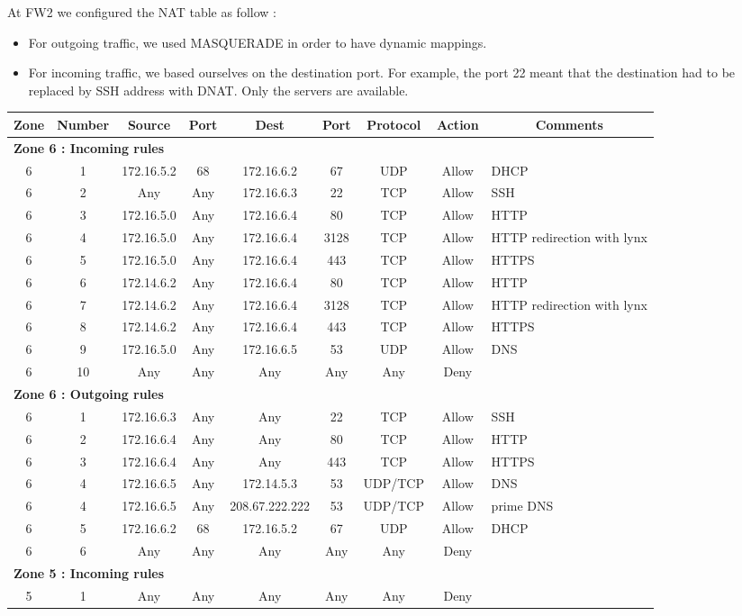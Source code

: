 \documentclass[a4paper,titlepage]{article}
\begin{document}
At FW2 we configured the NAT table as follow :
\begin{itemize}
\item For outgoing traffic, we used MASQUERADE in order to have dynamic mappings.
\item For incoming traffic, we based ourselves on the destination port. For example, the port 22 meant that the destination had to be replaced by SSH address with DNAT. Only the servers are available.
\end{itemize}


\begin{table}[h]
	\center
	\begin{tabular}{c|c|cc|cc|ccl}
		Zone & Number & Source & Port & Dest & Port & Protocol & Action & \multicolumn{1}{c}{Comments}\\
		\hline
		\multicolumn{9}{l}{\textbf{Zone 6 : Incoming rules}}\\
		6 & 1 & 172.16.5.2 & 68 & 172.16.6.2 & 67 & UDP & Allow & DHCP \\
		6 & 2 & Any & Any & 172.16.6.3 & 22 & TCP & Allow & SSH \\
		6 & 3 & 172.16.5.0 & Any & 172.16.6.4 & 80 & TCP & Allow & HTTP \\
		6 & 4 & 172.16.5.0 & Any & 172.16.6.4 & 3128 & TCP & Allow & HTTP redirection with lynx \\
		6 & 5 & 172.16.5.0 & Any & 172.16.6.4 & 443 & TCP & Allow & HTTPS \\
		6 & 6 & 172.14.6.2 & Any & 172.16.6.4 & 80 & TCP & Allow & HTTP \\
		6 & 7 & 172.14.6.2 & Any & 172.16.6.4 & 3128 & TCP & Allow & HTTP redirection with lynx  \\
		6 & 8 & 172.14.6.2 & Any & 172.16.6.4 & 443 & TCP & Allow & HTTPS \\
		6 & 9 & 172.16.5.0 & Any & 172.16.6.5 & 53 & UDP & Allow & DNS \\
		6 & 10 & Any & Any & Any & Any & Any & Deny & \\
		
		\hline
		\multicolumn{9}{l}{\textbf{Zone 6 : Outgoing rules}}\\
		
		6 & 1 & 172.16.6.3 & Any & Any & 22 & TCP & Allow & SSH\\
		6 & 2 & 172.16.6.4 & Any & Any & 80 & TCP & Allow & HTTP\\
		6 & 3 & 172.16.6.4 & Any & Any & 443 & TCP & Allow & HTTPS\\
		6 & 4 & 172.16.6.5 & Any & 172.14.5.3 & 53 & UDP/TCP & Allow & DNS \\
		6 & 4 & 172.16.6.5 & Any & 208.67.222.222 & 53 & UDP/TCP & Allow & prime DNS \\
		6 & 5 & 172.16.6.2 & 68 & 172.16.5.2 & 67 & UDP & Allow & DHCP \\
		6 & 6 & Any & Any & Any & Any & Any & Deny & \\
		\hline
		\multicolumn{9}{l}{\textbf{Zone 5 : Incoming rules}}\\
		5 & 1 & Any & Any & Any & Any & Any & Deny & \\


\end{tabular}
\end{table}
\end{document}
